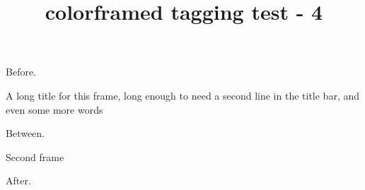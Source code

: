 \documentclass{article}
\title{colorframed tagging test - 4}
\begin{document}
Before.

\begin{titled-frame}{A long title for this frame, long enough to need a
    second line in the title bar, and even some more words}
\kant[1-6]
\end{titled-frame}

Between.

\begin{titled-frame}{Second frame}
\kant[7]
\end{titled-frame}

After.
\end{document}
